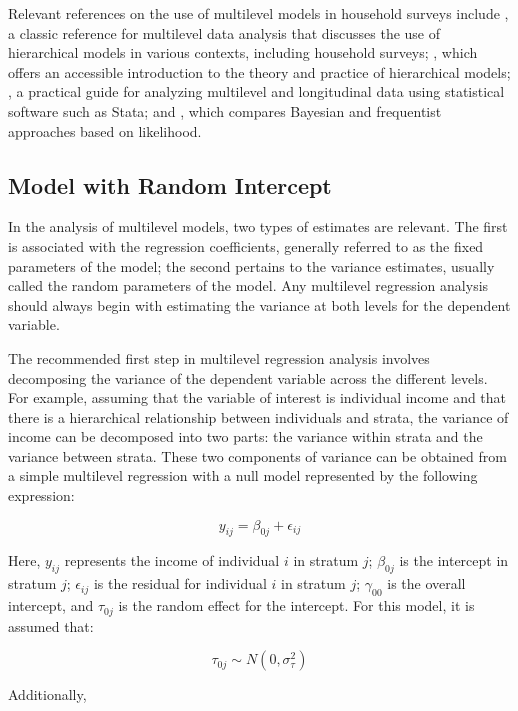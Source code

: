 \documentclass[
  12pt,
]{book}
\begin{document}
Relevant references on the use of multilevel models in household surveys include \citet{goldstein2011}, a classic reference for multilevel data analysis that discusses the use of hierarchical models in various contexts, including household surveys; \citet{gelmanhill2019}, which offers an accessible introduction to the theory and practice of hierarchical models; \citet{rabe2012multilevel}, a practical guide for analyzing multilevel and longitudinal data using statistical software such as Stata; and \citet{browne2006comparison}, which compares Bayesian and frequentist approaches based on likelihood.

\hypertarget{model-with-random-intercept}{%
\subsection{Model with Random Intercept}\label{model-with-random-intercept}}

In the analysis of multilevel models, two types of estimates are relevant. The first is associated with the regression coefficients, generally referred to as the fixed parameters of the model; the second pertains to the variance estimates, usually called the random parameters of the model. Any multilevel regression analysis should always begin with estimating the variance at both levels for the dependent variable.

The recommended first step in multilevel regression analysis involves decomposing the variance of the dependent variable across the different levels. For example, assuming that the variable of interest is individual income and that there is a hierarchical relationship between individuals and strata, the variance of income can be decomposed into two parts: the variance within strata and the variance between strata. These two components of variance can be obtained from a simple multilevel regression with a null model represented by the following expression:

\[
y_{ij} = \beta_{0j} + \epsilon_{ij}
\]

Here, \(y_{ij}\) represents the income of individual \(i\) in stratum \(j\); \(\beta_{0j}\) is the intercept in stratum \(j\); \(\epsilon_{ij}\) is the residual for individual \(i\) in stratum \(j\); \(\gamma_{00}\) is the overall intercept, and \(\tau_{0j}\) is the random effect for the intercept. For this model, it is assumed that:

\[
\tau_{0j} \sim N(0, \sigma_{\tau}^{2})
\]

Additionally,
\end{document}
